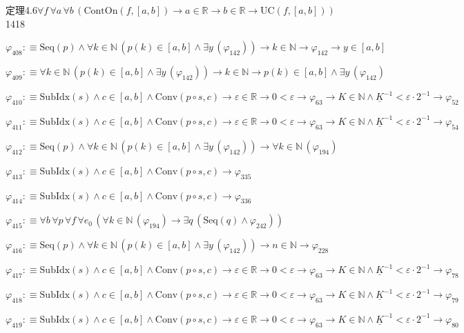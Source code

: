 \begin{fullproof}{定理4.6}{$\forall f\,\forall a\,\forall b\,(\mathrm{ContOn}(f,[a,b]) \to a \in \mathbb{R} \to b \in \mathbb{R} \to \mathrm{UC}(f,[a,b]))$}{1418}
\begin{abbrevlist}
\item $\varphi_{408} :\equiv \mathrm{Seq}(p) \land \forall k \in \mathbb{N}\,(p(k) \in [a,b] \land \exists y\,(\varphi_{142})) \to k \in \mathbb{N} \to \varphi_{142} \to y \in [a,b]$
\item $\varphi_{409} :\equiv \forall k \in \mathbb{N}\,(p(k) \in [a,b] \land \exists y\,(\varphi_{142})) \to k \in \mathbb{N} \to p(k) \in [a,b] \land \exists y\,(\varphi_{142})$
\item $\varphi_{410} :\equiv \mathrm{SubIdx}(s) \land c \in [a,b] \land \mathrm{Conv}(p \circ s,c) \to \varepsilon \in \mathbb{R} \to 0 < \varepsilon \to \varphi_{63} \to K \in \mathbb{N} \land \underline{K}^{-1} < \varepsilon \cdot 2^{-1} \to \varphi_{52}$
\item $\varphi_{411} :\equiv \mathrm{SubIdx}(s) \land c \in [a,b] \land \mathrm{Conv}(p \circ s,c) \to \varepsilon \in \mathbb{R} \to 0 < \varepsilon \to \varphi_{63} \to K \in \mathbb{N} \land \underline{K}^{-1} < \varepsilon \cdot 2^{-1} \to \varphi_{54}$
\item $\varphi_{412} :\equiv \mathrm{Seq}(p) \land \forall k \in \mathbb{N}\,(p(k) \in [a,b] \land \exists y\,(\varphi_{142})) \to \forall k \in \mathbb{N}\,(\varphi_{194})$
\item $\varphi_{413} :\equiv \mathrm{SubIdx}(s) \land c \in [a,b] \land \mathrm{Conv}(p \circ s,c) \to \varphi_{335}$
\item $\varphi_{414} :\equiv \mathrm{SubIdx}(s) \land c \in [a,b] \land \mathrm{Conv}(p \circ s,c) \to \varphi_{336}$
\item $\varphi_{415} :\equiv \forall b\,\forall p\,\forall f\,\forall e_{0}\,(\forall k \in \mathbb{N}\,(\varphi_{194}) \to \exists q\,(\mathrm{Seq}(q) \land \varphi_{242}))$
\item $\varphi_{416} :\equiv \mathrm{Seq}(p) \land \forall k \in \mathbb{N}\,(p(k) \in [a,b] \land \exists y\,(\varphi_{142})) \to n \in \mathbb{N} \to \varphi_{228}$
\item $\varphi_{417} :\equiv \mathrm{SubIdx}(s) \land c \in [a,b] \land \mathrm{Conv}(p \circ s,c) \to \varepsilon \in \mathbb{R} \to 0 < \varepsilon \to \varphi_{63} \to K \in \mathbb{N} \land \underline{K}^{-1} < \varepsilon \cdot 2^{-1} \to \varphi_{78}$
\item $\varphi_{418} :\equiv \mathrm{SubIdx}(s) \land c \in [a,b] \land \mathrm{Conv}(p \circ s,c) \to \varepsilon \in \mathbb{R} \to 0 < \varepsilon \to \varphi_{63} \to K \in \mathbb{N} \land \underline{K}^{-1} < \varepsilon \cdot 2^{-1} \to \varphi_{79}$
\item $\varphi_{419} :\equiv \mathrm{SubIdx}(s) \land c \in [a,b] \land \mathrm{Conv}(p \circ s,c) \to \varepsilon \in \mathbb{R} \to 0 < \varepsilon \to \varphi_{63} \to K \in \mathbb{N} \land \underline{K}^{-1} < \varepsilon \cdot 2^{-1} \to \varphi_{80}$

\end{abbrevlist}
\end{fullproof}
